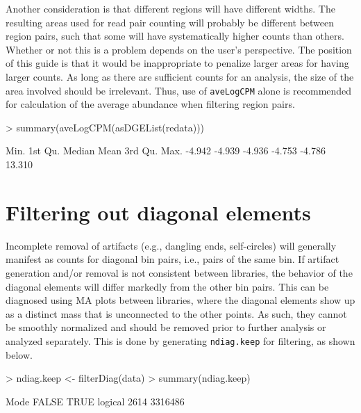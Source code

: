 \documentclass[12pt]{report}
\renewenvironment{Schunk}{\vspace{0pt}}{\vspace{0pt}}
\newcommand{\code}[1]{{\small\texttt{#1}}}
\begin{document}
Another consideration is that different regions will have different widths.
The resulting areas used for read pair counting will probably be different between region pairs, such that some will have systematically higher counts than others.
Whether or not this is a problem depends on the user's perspective.
The position of this guide is that it would be inappropriate to penalize larger areas for having larger counts. 
As long as there are sufficient counts for an analysis, the size of the area involved should be irrelevant.
Thus, use of \code{aveLogCPM} alone is recommended for calculation of the average abundance when filtering region pairs.

\begin{Schunk}
\begin{Sinput}
> summary(aveLogCPM(asDGEList(redata)))
\end{Sinput}
\begin{Soutput}
   Min. 1st Qu.  Median    Mean 3rd Qu.    Max. 
 -4.942  -4.939  -4.936  -4.753  -4.786  13.310 
\end{Soutput}
\end{Schunk}

\section{Filtering out diagonal elements}
Incomplete removal of artifacts (e.g., dangling ends, self-circles) will generally manifest as counts for diagonal bin pairs, i.e., pairs of the same bin.
If artifact generation and/or removal is not consistent between libraries, the behavior of the diagonal elements will differ markedly from the other bin pairs.
This can be diagnosed using MA plots between libraries, where the diagonal elements show up as a distinct mass that is unconnected to the other points.
As such, they cannot be smoothly normalized and should be removed prior to further analysis or analyzed separately.
This is done by generating \code{ndiag.keep} for filtering, as shown below.

\begin{Schunk}
\begin{Sinput}
> ndiag.keep <- filterDiag(data)
> summary(ndiag.keep)
\end{Sinput}
\begin{Soutput}
   Mode   FALSE    TRUE 
logical    2614 3316486 
\end{Soutput}
\end{Schunk}
\end{document}
